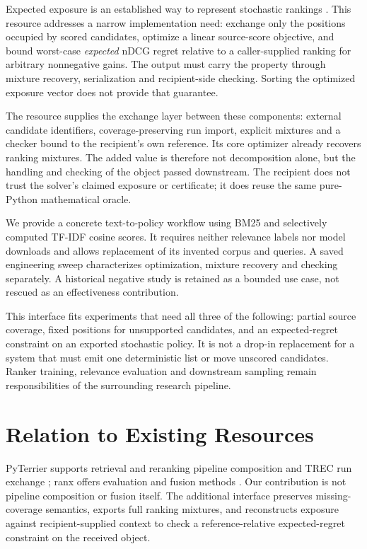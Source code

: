 \documentclass[runningheads]{llncs}
\begin{document}
Expected exposure is an established way to represent stochastic rankings
\cite{diaz,singh}. This resource addresses a narrow implementation need:
exchange only the positions occupied by scored candidates, optimize a linear
source-score objective, and bound worst-case \emph{expected} nDCG regret
relative to a caller-supplied ranking for arbitrary nonnegative gains.
The output must carry the property through mixture recovery, serialization
and recipient-side checking. Sorting the optimized exposure vector does not
provide that guarantee.

The resource supplies the exchange layer between these components: external
candidate identifiers, coverage-preserving run import, explicit mixtures and
a checker bound to the recipient's own reference. Its core optimizer already
recovers ranking mixtures. The added value is therefore not decomposition
alone, but the handling and checking of the object passed downstream.
The recipient does not trust the solver's claimed exposure or certificate;
it does reuse the same pure-Python mathematical oracle.

We provide a concrete text-to-policy workflow using BM25 and selectively
computed TF-IDF cosine scores. It requires neither relevance labels nor model
downloads and allows replacement of its invented corpus and queries.
A saved engineering sweep characterizes optimization, mixture recovery and
checking separately. A historical negative study is retained as a bounded
use case, not rescued as an effectiveness contribution.

This interface fits experiments that need all three of the following:
partial source coverage, fixed positions for unsupported candidates, and an
expected-regret constraint on an exported stochastic policy. It is not a
drop-in replacement for a system that must emit one deterministic list or
move unscored candidates. Ranker training, relevance evaluation and downstream
sampling remain responsibilities of the surrounding research pipeline.

\section{Relation to Existing Resources}
PyTerrier supports retrieval and reranking pipeline composition and TREC run exchange
\cite{pyterrier}; ranx offers evaluation and fusion methods \cite{ranx}.
Our contribution is not pipeline composition or fusion itself. The additional
interface preserves missing-coverage semantics, exports full ranking mixtures,
and reconstructs exposure against recipient-supplied context to check a
reference-relative expected-regret constraint on the received object.
\end{document}
